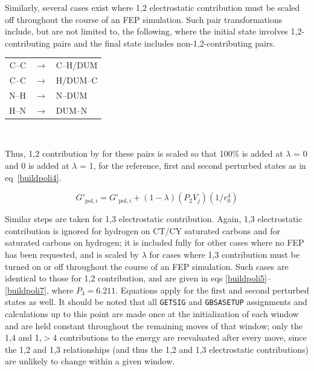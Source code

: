 \documentclass[12pt]{report}
\def\equlab{eq}\def\equslab{Eqs.}
\newcommand*\eq[1]{\equlab~\ref{#1}}
\begin{document}
Similarly, several cases exist where 1,2 electrostatic contribution must be scaled off throughout the course of an FEP simulation. Such pair transformations include, but are not limited to, the following, where the initial state involves 1,2-contributing pairs and the final state includes non-1,2-contributing pairs.

\vspace*{.4cm}
\begin{singlespace}
{\centering
\begin{tabular}{rcl}
C--C & $\longrightarrow$ & C--H/DUM \\ 
C--C & $\longrightarrow$ & H/DUM--C \\
N--H & $\longrightarrow$ & N--DUM \\
H--N & $\longrightarrow$ & DUM--N \\
\end{tabular}\\}
\end{singlespace}
\vspace*{.6cm}

Thus, 1,2 contribution by for these pairs is scaled so that 100\% is added at $\lambda$ = 0 and 0 is added at $\lambda$ = 1, for the reference, first and second perturbed states as in \eq{buildpoli4}.

\vspace*{-.4cmt}
\begin{equation}
\label{buildpoli4}
G'_{ \textrm{pol},i} = G'_{ \textrm{pol},i} + (1 - \lambda)(P_{2}V_{j})(1/r^{4}_{0})
\end{equation}
\vspace*{-0.6cm}

Similar steps are taken for 1,3 electrostatic contribution. Again, 1,3 electrostatic contribution is ignored for hydrogen on CT/CY saturated carbons and for saturated carbons on hydrogen; it is included fully for other cases where no FEP has been requested, and is scaled by $\lambda$ for cases where 1,3 contribution must be turned on or off throughout the course of an FEP simulation. Such cases are identical to those for 1,2 contribution, and are given in eqs \ref{buildpoli5}--\ref{buildpoli7}, where $P_{3} = 6.211$. Equations apply for the first and second perturbed states as well. It should be noted that all {\tt GETSIG} and {\tt GBSASETUP} assignments and calculations up to this point are made once at the initialization of each window and are held constant throughout the remaining moves of that window; only the 1,4 and 1,$>$4 contributions to the energy are reevaluated after every move, since the 1,2 and 1,3 relationships (and thus the 1,2 and 1,3 electrostatic contributions) are unlikely to change within a given window.
\end{document}
